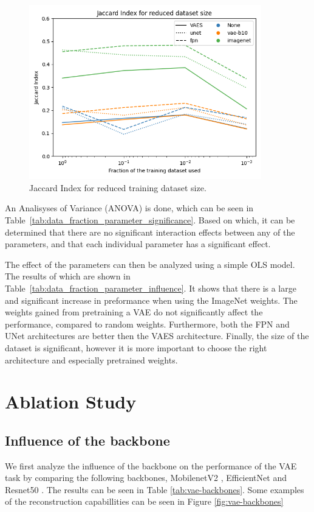 \begin{figure}[h]
    \centering
    \includegraphics[width=0.9\textwidth]{figures/data_percentage/line-plot.png}
    \caption{Jaccard Index for reduced training dataset size.}
    \label{fig:dataset-fraction-results}
\end{figure}

An Analisyses of Variance (ANOVA) is done, which can be seen in Table~\ref{tab:data_fraction_parameter_significance}. Based on which, it can be determined that there are no significant interaction effects between any of the parameters, and that each individual parameter has a significant effect.


The effect of the parameters can then be analyzed using a simple OLS model. The results of which are shown in Table~\ref{tab:data_fraction_parameter_influence}. It shows that there is a large and significant increase in preformance when using the ImageNet weights. The weights gained from pretraining a VAE do not significantly affect the performance, compared to random weights. Furthermore, both the FPN and UNet architectures are better then the VAES architecture. Finally, the size of the dataset is significant, however it is more important to choose the right architecture and especially pretrained weights.



\section{Ablation Study}
\subsection{Influence of the backbone}
We first analyze the influence of the backbone on the performance of the VAE task by comparing the following backbones, MobilenetV2 \cite{sandler2019mobilenetv2invertedresidualslinear}, EfficientNet \cite{tan2020efficientnetrethinkingmodelscaling} and Resnet50 \cite{he2015deep}. The results can be seen in Table \ref{tab:vae-backbones}. Some examples of the reconstruction capabillities can be seen in Figure \ref{fig:vae-backbones}


